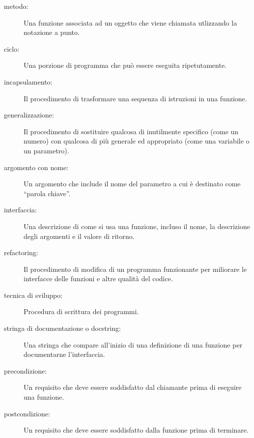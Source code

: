 \documentclass[10pt]{book}
\begin{document}
\begin{description}

\item[metodo:] Una funzione associata ad un oggetto che viene chiamata utlizzando la notazione a punto.

\item[ciclo:] Una porzione di programma che può essere eseguita ripetutamente.

\item[incapsulamento:] Il procedimento di trasformare una sequenza di istruzioni in una funzione.

\item[generalizzazione:] Il procedimento di sostituire qualcosa di inutilmente specifico (come un numero) con qualcosa di più generale ed appropriato (come una variabile o un parametro).

\item[argomento con nome:] Un argomento che include il nome del parametro a cui è destinato come ``parola chiave''.

\item[interfaccia:] Una descrizione di come si usa una funzione, incluso il nome, la descrizione degli argomenti e il valore di ritorno.

\item[refactoring:] Il procedimento di modifica di un programma funzionante per miliorare le interfacce delle funzioni e altre qualità del codice.

\item[tecnica di sviluppo:] Procedura di scrittura dei programmi.

\item[stringa di documentazione o docstring:]  Una stringa che compare all'inizio di una definizione di una funzione per documentarne l'interfaccia.

\item[precondizione:] Un requisito che deve essere soddisfatto dal chiamante prima di eseguire una funzione.

\item[postcondizione:] Un requisito che deve essere soddisfatto dalla funzione prima di terminare.

\end{description}
\end{document}
